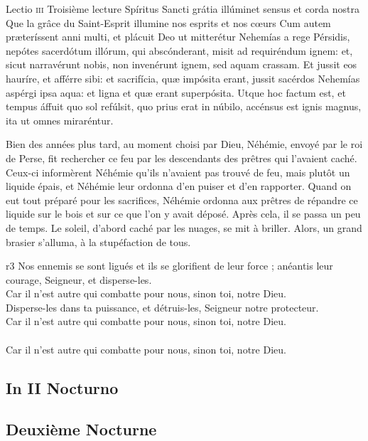 \documentclass[twoside]{article}
\begin{document}
\begin{paracol}[1]{2}
\lectioresponsorium
	{Lectio \textsc{iii}}
	{Troisième lecture}
	{Spíritus Sancti grátia illúminet sensus et corda nostra}
	{Que la grâce du Saint-Esprit illumine nos esprits et nos cœurs}
	{
		Cum autem præteríssent anni multi, et plácuit Deo ut mitterétur Nehemías a rege Pérsidis, 
		nepótes sacerdótum illórum, qui abscónderant, misit ad requiréndum ignem: et, sicut narravérunt nobis, non invenérunt ignem, sed aquam crassam.
		Et jussit eos hauríre, et afférre sibi: et sacrifícia, quæ impósita erant, jussit sacérdos Nehemías aspérgi ipsa aqua: et ligna et quæ erant superpósita.
		Utque hoc factum est, et tempus áffuit quo sol refúlsit, quo prius erat in núbilo, accénsus est ignis magnus, ita ut omnes miraréntur.
	}
	{	
	
		Bien des années plus tard, au moment choisi par Dieu, Néhémie, envoyé par le roi de Perse, fit rechercher ce feu par les descendants des prêtres qui l’avaient caché. 
		Ceux-ci informèrent Néhémie qu’ils n’avaient pas trouvé de feu, mais plutôt un liquide épais, et Néhémie leur ordonna d’en puiser et d’en rapporter.
		Quand on eut tout préparé pour les sacrifices, Néhémie ordonna aux prêtres de répandre ce liquide sur le bois et sur ce que l’on y avait déposé.
		Après cela, il se passa un peu de temps. Le soleil, d’abord caché par les nuages, se mit à briller. Alors, un grand brasier s’alluma, à la stupéfaction de tous.
	}
	{r3}
	{\rr Nos ennemis se sont ligués et ils se glorifient de leur force ; anéantis leur courage, Seigneur, et disperse-les.\\
	\GreSpecial{*} Car il n'est autre qui combatte pour nous, sinon toi, notre Dieu.\\
	\vv Disperse-les dans ta puissance, et détruis-les, Seigneur notre protecteur.\\
	\GreSpecial{*} Car il n'est autre qui combatte pour nous, sinon toi, notre Dieu.\\
	\versetGloireAuPere{}\\
	\GreSpecial{*} Car il n'est autre qui combatte pour nous, sinon toi, notre Dieu.}

\subsection{In II Nocturno}

\switchcolumn

\subsection{Deuxième Nocturne}


\end{paracol}
\end{document}
